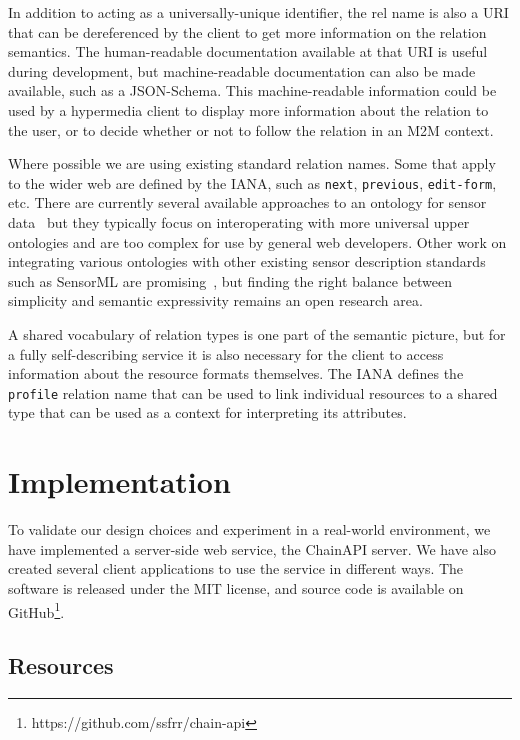 \documentclass{acm_proc_article-sp}
\begin{document}
In addition to acting as a universally-unique identifier, the rel name is also
a URI that can be dereferenced by the client to get more information on the
relation semantics. The human-readable documentation available at that URI is
useful during development, but machine-readable documentation can also be made
available, such as a JSON-Schema. This machine-readable information could be
used by a hypermedia client to display more information about the relation to
the user, or to decide whether or not to follow the relation in an M2M context.

Where possible we are using existing standard relation names. Some that apply
to the wider web are defined by the IANA, such as \texttt{next},
\texttt{previous}, \texttt{edit-form}, etc. There are currently several
available approaches to an ontology for sensor
data~\cite{w3contology}\cite{broring2011}\cite{eid2007} but they typically
focus on interoperating with more universal upper ontologies and are too
complex for use by general web developers. Other work on integrating various
ontologies with other existing sensor description standards such as SensorML
are promising~\cite{russomanno2005}, but finding the right balance between
simplicity and semantic expressivity remains an open research area.

A shared vocabulary of relation types is one part of the semantic picture, but
for a fully self-describing service it is also necessary for the client to
access information about the resource formats themselves. The IANA defines the
\texttt{profile} relation name that can be used to link individual resources to
a shared type that can be used as a context for interpreting its attributes.

\section{Implementation}

To validate our design choices and experiment in a real-world environment, we
have implemented a server-side web service, the ChainAPI server. We have also
created several client applications to use the service in different ways.  The
software is released under the MIT license, and source code is available on
GitHub\footnote{https://github.com/ssfrr/chain-api}.

\subsection{Resources}
\label{api_resources}
\end{document}
